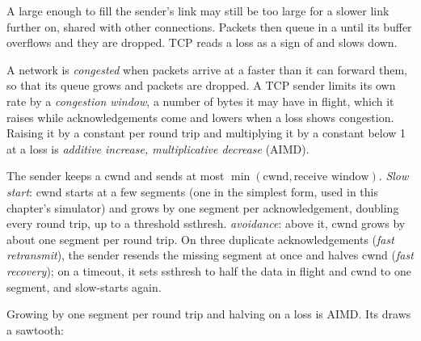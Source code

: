 A  large enough to fill the sender's link may still be too large for a slower link further on, shared with
other connections. Packets then queue in a  until its buffer overflows and they are dropped. TCP reads a loss
as a sign of  and slows down.

\begin{definition}\label{def:b2:transport-layer:congestion}
A network is \emph{congested} when packets arrive at a  faster than it can forward them,
so that its queue grows and packets are dropped. A TCP sender limits its own rate by a \emph{congestion
window}, a number of bytes it may have in flight, which it raises while acknowledgements
come and lowers when a loss shows congestion. Raising it by a constant per round trip and multiplying it by a
constant below 1 at a loss is \emph{additive increase, multiplicative decrease} (AIMD).
\end{definition}

\begin{method}\label{met:b2:transport-layer:cc}
The sender keeps a \emph{} cwnd and sends at most $\min(\text{cwnd}, \text{receive window})$.
\emph{Slow start}: cwnd starts at a few segments (one in the simplest form, used in this chapter's simulator) and grows by one segment per acknowledgement, doubling every round
trip, up to a threshold ssthresh. \emph{ avoidance}: above it, cwnd grows by about one segment per round
trip. On three duplicate acknowledgements (\emph{fast retransmit}), the sender resends the missing segment at once
and halves cwnd (\emph{fast recovery}); on a timeout, it sets ssthresh to half the data in flight and cwnd to one
segment, and slow-starts again.
\end{method}

Growing by one segment per round trip and halving on a loss is AIMD. Its  draws a sawtooth:

